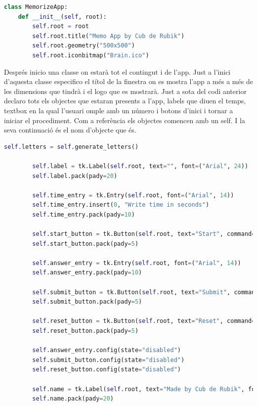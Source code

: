 \begin{lstlisting}[language=Python, style=colorEX, caption=Inici de la classe i especificació de la finestra]
class MemorizeApp:    
    def __init__(self, root):
        self.root = root
        self.root.title("Memo App by Cub de Rubik")
        self.root.geometry("500x500")
        self.root.iconbitmap("Brain.ico")
\end{lstlisting}

Després inicio una classe on estarà tot el contingut i de l'app. Just a l'inici d'aquesta classe
especifico el títol de la finestra on es mostra l'app a més a més de les dimensions que tindrà i
el logo que es mostrarà. Just a sota del codi anterior declaro tots els objectes que estaran presents a l'app, labels que
diuen el temps, textbox en la qual l'usuari omple amb un número i botons d'inici i tornar a iniciar
el procediment. Com a referència els objectes comencen amb un self. I la seva continuació és
el nom d'objecte que és. 

\begin{lstlisting}[language=Python, style=colorEX, caption=Declaració d'objectes necessaris pel funcionament de l'App]
        self.letters = self.generate_letters()

        self.label = tk.Label(self.root, text="", font=("Arial", 24))
        self.label.pack(pady=20)

        self.time_entry = tk.Entry(self.root, font=("Arial", 14))
        self.time_entry.insert(0, "Write time in seconds")
        self.time_entry.pack(pady=10)

        self.start_button = tk.Button(self.root, text="Start", command=self.start_memorize)
        self.start_button.pack(pady=5)

        self.answer_entry = tk.Entry(self.root, font=("Arial", 14))
        self.answer_entry.pack(pady=10)

        self.submit_button = tk.Button(self.root, text="Submit", command=self.check_answers)
        self.submit_button.pack(pady=5)

        self.reset_button = tk.Button(self.root, text="Reset", command=self.reset)
        self.reset_button.pack(pady=5)

        self.answer_entry.config(state="disabled")
        self.submit_button.config(state="disabled")
        self.reset_button.config(state="disabled")

        self.name = tk.Label(self.root, text="Made by Cub de Rubik", font=("Arial", 8))
        self.name.pack(pady=20)
\end{lstlisting}

